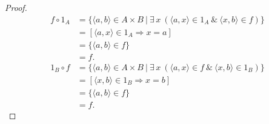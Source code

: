 \documentclass[12pt]{article}
\begin{document}
\begin{enumerate}
    \begin{proof}
      \begin{equation*}
        \begin{array}{rl}
          f \circ 1_A & = \{\langle a, b \rangle \in A \times B~|~\exists\, x~(\langle a, x \rangle \in 1_A~\&~\langle x, b \rangle \in f)\} \\
                      & = [\langle a, x \rangle \in 1_A \Rightarrow x = a] \\
                      & = \{\langle a, b \rangle \in f\} \\
                      & = f.
        \end{array}
      \end{equation*}
      \begin{equation*}
        \begin{array}{rl}
          1_B \circ f & = \{\langle a, b \rangle \in A \times B~|~\exists\, x~(\langle a, x \rangle \in f~\&~\langle x, b \rangle \in 1_B)\} \\
                      & = [\langle x, b \rangle \in 1_B \Rightarrow x = b] \\
                      & = \{\langle a, b \rangle \in f\} \\
                      & = f.
        \end{array}
      \end{equation*}
    \end{proof}


\end{enumerate}
\end{document}
